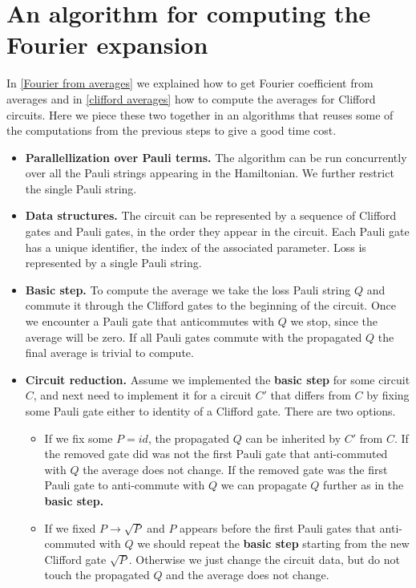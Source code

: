 \documentclass[12 pt]{article}
\begin{document}
\section{An algorithm for computing the Fourier expansion}
In \ref{Fourier from averages} we explained how to get Fourier coefficient from averages and in \ref{clifford averages} how to compute the averages for Clifford circuits. Here we piece these two together in an algorithms that reuses some of the computations from the previous steps to give a good time cost.

\begin{itemize}
	\item \textbf{Parallellization over Pauli terms.} The algorithm can be run concurrently over all the Pauli strings appearing in the Hamiltonian. We further restrict the single Pauli string.
	\item \textbf{Data structures.} The circuit can be represented by a sequence of Clifford gates and Pauli gates, in the order they appear in the circuit. Each Pauli gate has a unique identifier, the index of the associated parameter. Loss is represented by a single Pauli string.
	\item \textbf{Basic step.} To compute the average we take the loss Pauli string $Q$ and commute it through the Clifford gates to the beginning of the circuit. Once we encounter a Pauli gate that anticommutes with $Q$ we stop, since the average will be zero.  If all Pauli gates commute with the propagated $Q$ the final average is trivial to compute.
	\item \textbf{Circuit reduction.} Assume we implemented the \textbf{basic step} for some circuit $C$, and next need to implement it for a circuit $C'$ that differs from $C$ by fixing some Pauli gate either to identity of a Clifford gate. There are two options.
	\begin{itemize}
		\item If we fix some $P=id$, the propagated $Q$ can be inherited by $C'$ from $C$. If the removed gate did was not the first Pauli gate that anti-commuted with $Q$ the average does not change. If the removed gate was the first Pauli gate to anti-commute with $Q$ we can propagate $Q$ further as in the \textbf{basic step.}
		\item If we fixed $P\to \sqrt{P}$ and $P$ appears before the first Pauli gates that anti-commuted with $Q$ we should repeat the \textbf{basic step} starting from the new Clifford gate $\sqrt{P}$. Otherwise we just change the circuit data, but do not touch the propagated $Q$ and the average does not change.

\end{itemize}
\end{itemize}
\end{document}
